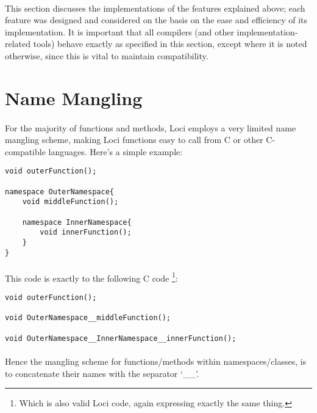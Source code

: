 \documentclass[12pt,twoside,notitlepage]{report}
\begin{document}
\paragraph{}
This section discusses the implementations of the features explained above; each feature was designed and considered on the basis on the ease and efficiency of its implementation. It is important that all compilers (and other implementation-related tools) behave exactly as specified in this section, except where it is noted otherwise, since this is vital to maintain compatibility.

\section{Name Mangling}

\paragraph{}
For the majority of functions and methods, Loci employs a very limited name mangling scheme, making Loci functions easy to call from C or other C-compatible languages. Here's a simple example:

\begin{lstlisting}
void outerFunction();

namespace OuterNamespace{
	void middleFunction();
	
	namespace InnerNamespace{
		void innerFunction();
	}
}
\end{lstlisting}

\paragraph{}
This code is exactly to the following C code \footnote{Which is also valid Loci code, again expressing exactly the same thing.}:

\begin{lstlisting}
void outerFunction();

void OuterNamespace__middleFunction();

void OuterNamespace__InnerNamespace__innerFunction();
\end{lstlisting}

\paragraph{}
Hence the mangling scheme for functions/methods within namespaces/classes, is to concatenate their names with the separator `\_\_'.
\end{document}
